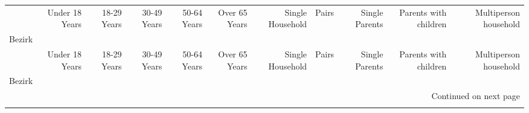 \begin{longtable}{lrrrrrrrrrr}
\label{table:Districts}\\
\toprule
{} & Under 18 Years & 18-29 Years & 30-49 Years & 50-64 Years & Over 65 Years & Single Household & Pairs & Single Parents & Parents with children & Multiperson household \\
Bezirk                     &                &             &             &             &               &                  &       &                &                       &                       \\
\midrule
\endfirsthead

\toprule
{} & Under 18 Years & 18-29 Years & 30-49 Years & 50-64 Years & Over 65 Years & Single Household & Pairs & Single Parents & Parents with children & Multiperson household \\
Bezirk                     &                &             &             &             &               &                  &       &                &                       &                       \\
\midrule
\endhead
\midrule
\multicolumn{11}{r}{{Continued on next page}} \\
\midrule
\endfoot


\end{longtable}
